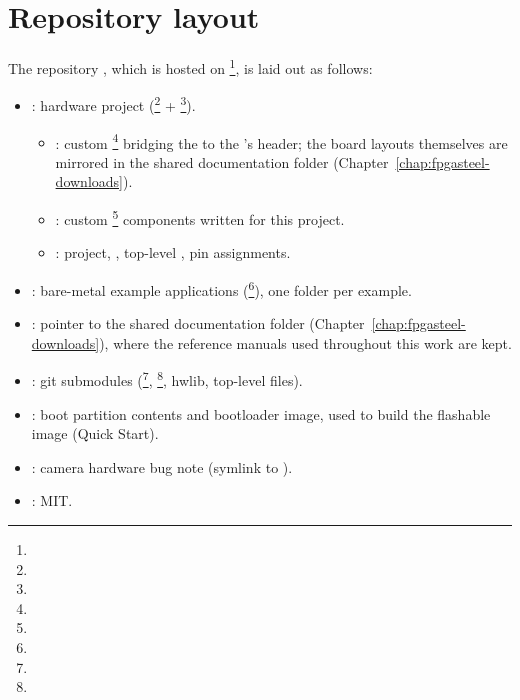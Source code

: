 \section{Repository layout}

The  repository \cite{FPGASTEEL-REPO}, which is hosted on \footnote{}, is laid out as follows:

\begin{itemize}
    \item {}:  hardware project (\footnote{} + \footnote{}).
    \begin{itemize}
        \item {}: custom \footnote{} bridging the  to the 's  header; the board layouts themselves are mirrored in the shared documentation folder (Chapter~\ref{chap:fpgasteel-downloads}).
        \item {}: custom  \footnote{} components written for this project.
        \item {}:  project, , top-level , pin assignments.
    \end{itemize}
    \item {}: bare-metal example applications (\footnote{}), one folder per example.
    \item {}: pointer to the shared documentation folder (Chapter~\ref{chap:fpgasteel-downloads}), where the reference manuals used throughout this work are kept.
    \item {}: git submodules (\footnote{}, \footnote{},  hwlib,  top-level files).
    \item {}:  boot partition contents and bootloader image, used to build the flashable image (Quick Start).
    \item {}: camera hardware bug note (symlink to ).
    \item {}: MIT.
\end{itemize}
